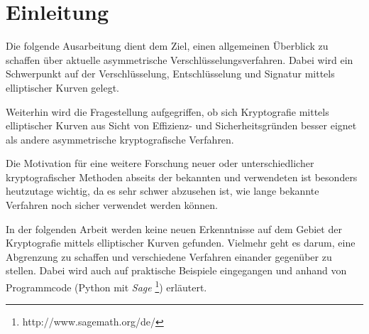 \chapter{Einleitung}

Die folgende Ausarbeitung dient dem Ziel, einen allgemeinen Überblick zu schaffen über 
aktuelle asymmetrische Verschlüsselungsverfahren. Dabei wird ein Schwerpunkt auf der 
Verschlüsselung, Entschlüsselung und Signatur mittels elliptischer Kurven gelegt.

Weiterhin wird die Fragestellung aufgegriffen, ob sich Kryptografie mittels elliptischer Kurven
aus Sicht von Effizienz- und Sicherheitsgründen besser eignet als andere asymmetrische 
kryptografische Verfahren.

Die Motivation für eine weitere Forschung neuer oder unterschiedlicher kryptografischer Methoden
abseits der bekannten und verwendeten ist besonders heutzutage wichtig, da es sehr schwer
abzusehen ist, wie lange bekannte Verfahren noch sicher verwendet werden können.

In der folgenden Arbeit werden keine neuen Erkenntnisse auf dem Gebiet der Kryptografie mittels elliptischer Kurven gefunden.
Vielmehr geht es darum, eine Abgrenzung zu schaffen und verschiedene Verfahren einander gegenüber zu stellen.
Dabei wird auch auf praktische Beispiele eingegangen und anhand von Programmcode (Python mit \emph{Sage} \footnote{http://www.sagemath.org/de/}) erläutert.

